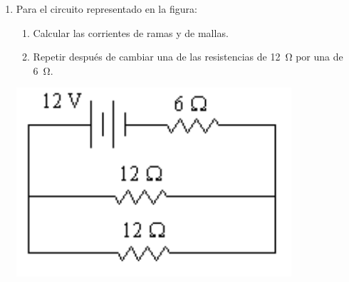 \documentclass[11pt,spanish,a4paper]{article}
\begin{document}
\begin{enumerate}
	\item \begin{minipage}[t]{0.7\textwidth}
		Para el circuito representado en la figura:
		\begin{enumerate}
			\item Calcular las corrientes de ramas y de mallas.
			\item Repetir después de cambiar una de las resistencias de \SI{12}{\ohm} por una de \SI{6}{\ohm}. 
		\end{enumerate}
    \end{minipage}
    \begin{minipage}[c][1em][t]{0.2\textwidth}
            \includegraphics[width=\textwidth]{p3e02}
    \end{minipage}



\end{enumerate}
\end{document}
